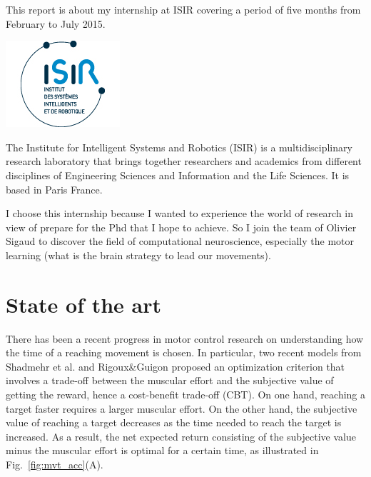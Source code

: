 \documentclass[pdftex,a4paper,12pt]{report}
\begin{document}
This report is about my internship at ISIR covering a period of five months from February to July 2015.
\linebreak 
\linebreak
\linebreak
\begin{minipage}{0.49\textwidth}
	\includegraphics[]{images/logo_isir.jpg}
\end{minipage}
\begin{minipage}{0.49\textwidth}
	The Institute for Intelligent Systems and Robotics (ISIR) is a multidisciplinary research laboratory that brings together researchers and academics from different disciplines of Engineering Sciences and Information and the Life Sciences. It is based in Paris France.
\end{minipage}
\vspace{8mm}

I choose this internship because I wanted to experience the world of research in view of prepare for the Phd that I hope to achieve. So I join the team of Olivier Sigaud to discover the field of computational neuroscience, especially the motor learning (what is the brain strategy to lead our movements).

\pagebreak

\section{State of the art}

There has been a recent progress in motor control research on understanding how the time of a reaching movement is chosen. In particular, two recent models from Shadmehr et al. \cite{shadmehr10} and Rigoux\&Guigon \cite{rigoux12_plos} proposed an optimization criterion that involves a trade-off between the muscular effort and the subjective value of getting the reward, hence a cost-benefit trade-off (CBT).
On one hand, reaching a target faster requires a larger muscular effort. On the other hand, the subjective value of reaching a target decreases as the time needed to reach the target is increased. As a result, the net expected return consisting of the subjective value minus the muscular effort is optimal for a certain time, as illustrated in Fig.~\ref{fig:mvt_acc}(A).
\end{document}
